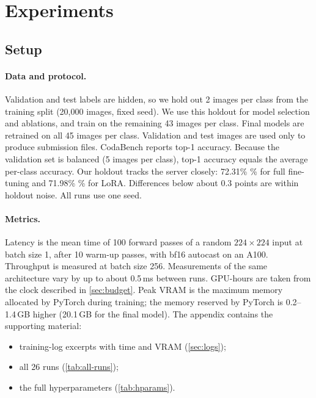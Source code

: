 \section{Experiments}
\label{sec:experiments}

\subsection{Setup}
\label{sec:setup}

\paragraph{Data and protocol.}
Validation and test labels are hidden, so we hold out 2 images per class from the training split (20,000 images, fixed seed).
We use this holdout for model selection and ablations, and train on the remaining 43 images per class.
Final models are retrained on all 45 images per class.
Validation and test images are used only to produce submission files.
CodaBench reports top-1 accuracy.
Because the validation set is balanced (5 images per class), top-1 accuracy equals the average per-class accuracy.
Our holdout tracks the server closely: 72.31\% \% for full fine-tuning and 71.98\% \% for LoRA.
Differences below about 0.3 points are within holdout noise.
All runs use one seed.

\paragraph{Metrics.}
Latency is the mean time of 100 forward passes of a random $224 \times 224$ input at batch size 1, after 10 warm-up passes, with bf16 autocast on an A100.
Throughput is measured at batch size 256.
Measurements of the same architecture vary by up to about 0.5\,ms between runs.
GPU-hours are taken from the clock described in \cref{sec:budget}.
Peak VRAM is the maximum memory allocated by PyTorch during training; the memory reserved by PyTorch is 0.2--1.4\,GB higher (20.1\,GB for the final model).
The appendix contains the supporting material:
\begin{itemize}[leftmargin=*,itemsep=0pt,topsep=2pt]
    \item training-log excerpts with time and VRAM (\cref{sec:logs});
    \item all 26 runs (\cref{tab:all-runs});
    \item the full hyperparameters (\cref{tab:hparams}).
\end{itemize}

